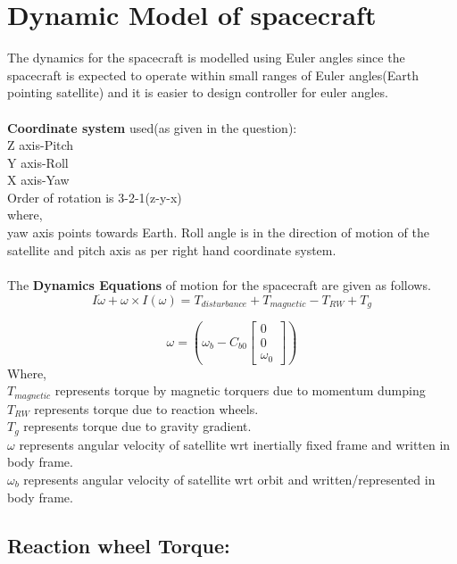 \documentclass[10pt,a4paper]{report}
\begin{document}
\chapter{Dynamic Model of spacecraft}
The dynamics for the spacecraft is modelled using Euler angles since the spacecraft is expected to operate within small ranges of Euler angles(Earth pointing satellite) and it is easier to design controller for euler angles.\\ \\
\textbf{Coordinate system} used(as given in the question):\\
Z axis-Pitch\\
Y axis-Roll\\
X axis-Yaw\\
Order of rotation is 3-2-1(z-y-x)\\
where,\\
yaw axis points towards Earth. Roll angle is in the direction of motion of the satellite and pitch axis as per right hand coordinate system.
\\ \\
The \textbf{Dynamics Equations} of motion for the spacecraft are given as follows.\\
\begin{equation}
I\dot{\omega}+\omega\times I(\omega)=T_{disturbance}+T_{magnetic}-T_{RW}+T_{g}
\end{equation}

\begin{equation}
\omega=\left(\omega_{b}-C_{b0}\begin{bmatrix}
0\\0\\\omega_{0}
\end{bmatrix}\right)
\end{equation}
Where,\\
	$ T_{magnetic} $ represents torque by magnetic torquers due to momentum dumping \\
	$ T_{RW} $ represents torque due to reaction wheels.\\
	$ T_{g} $ represents torque due to gravity gradient.\\
	$ \omega $ represents angular velocity of satellite wrt inertially fixed frame and written in body frame.\\
	$ \omega_b $ represents angular velocity of satellite wrt orbit and written/represented in body frame.

\section{Reaction wheel Torque:}
\end{document}
